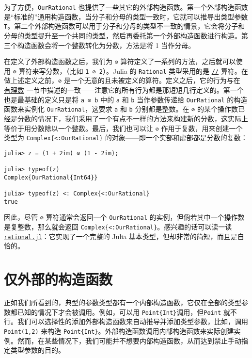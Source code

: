 为了方便，\texttt{OurRational} 也提供了一些其它的外部构造函数。第一个外部构造函数是“标准的”通用构造函数，当分子和分母的类型一致时，它就可以推导出类型参数 \texttt{T}。第二个外部构造函数可以用于分子和分母的类型不一致的情景，它会将分子和分母的类型提升至一个共同的类型，然后再委托第一个外部构造函数进行构造。第三个构造函数会将一个整数转化为分数，方法是将 1 当作分母。



在定义了外部构造函数之后，我们为 \texttt{⊘} 算符定义了一系列的方法，之后就可以使用 \texttt{⊘} 算符来写分数，（比如 \texttt{1 ⊘ 2}）。Julia 的 \texttt{Rational} 类型采用的是 \hyperlink{17539582191808611917}{\texttt{//}} 算符。在做上述定义之前，\texttt{⊘} 是一个无意的且未被定义的算符。定义之后，它的行为与在 \href{@ref Rational-Numbers}{有理数} 一节中描述的一致——注意它的所有行为都是那短短几行定义的。第一个也是最基础的定义只是将 \texttt{a ⊘ b} 中的 \texttt{a} 和 \texttt{b} 当作参数传递给 \texttt{OurRational} 的构造函数来实例化 \texttt{OurRational}，这要求 \texttt{a} 和 \texttt{b} 分别都是整数。在 \texttt{⊘} 的某个操作数已经是分数的情况下，我们采用了一个有点不一样的方法来构建新的分数，这实际上等价于用分数除以一个整数。最后，我们也可以让 \texttt{⊘} 作用于复数，用来创建一个类型为 \texttt{Complex\{<:OurRational\}} 的对象——即一个实部和虚部都是分数的复数：




\begin{verbatim}
julia> z = (1 + 2im) ⊘ (1 - 2im);

julia> typeof(z)
Complex{OurRational{Int64}}

julia> typeof(z) <: Complex{<:OurRational}
true
\end{verbatim}



因此，尽管 \texttt{⊘} 算符通常会返回一个 \texttt{OurRational} 的实例，但倘若其中一个操作数是复整数，那么就会返回 \texttt{Complex\{<:OurRational\}}。感兴趣的话可以读一读 \href{https://github.com/JuliaLang/julia/blob/master/base/rational.jl}{\texttt{rational.jl}}：它实现了一个完整的 Julia 基本类型，但却非常的简短，而且是自恰的。



\hypertarget{1423089157217028680}{}


\section{仅外部的构造函数}



正如我们所看到的，典型的参数类型都有一个内部构造函数，它仅在全部的类型参数都已知的情况下才会被调用。例如，可以用 \texttt{Point\{Int\}}调用，但\texttt{Point} 就不行。我们可以选择性的添加外部构造函数来自动推导并添加类型参数，比如，调用 \texttt{Point(1,2)} 来构造 \texttt{Point\{Int\}}。外部构造函数调用内部构造函数来实际创建实例。然而，在某些情况下，我们可能并不想要内部构造函数，从而达到禁止手动指定类型参数的目的。



